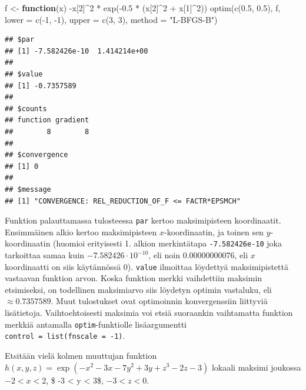 \documentclass[
]{book}
\newenvironment{Shaded}{\begin{snugshade}}{\end{snugshade}}
\newcommand{\AttributeTok}[1]{\textcolor[rgb]{0.77,0.63,0.00}{#1}}
\newcommand{\ControlFlowTok}[1]{\textcolor[rgb]{0.13,0.29,0.53}{\textbf{#1}}}
\newcommand{\DecValTok}[1]{\textcolor[rgb]{0.00,0.00,0.81}{#1}}
\newcommand{\FloatTok}[1]{\textcolor[rgb]{0.00,0.00,0.81}{#1}}
\newcommand{\FunctionTok}[1]{\textcolor[rgb]{0.00,0.00,0.00}{#1}}
\newcommand{\NormalTok}[1]{#1}
\newcommand{\OtherTok}[1]{\textcolor[rgb]{0.56,0.35,0.01}{#1}}
\newcommand{\SpecialCharTok}[1]{\textcolor[rgb]{0.00,0.00,0.00}{#1}}
\newcommand{\StringTok}[1]{\textcolor[rgb]{0.31,0.60,0.02}{#1}}
\begin{document}
\begin{Shaded}
\begin{Highlighting}[]
\NormalTok{f }\OtherTok{\textless{}{-}} \ControlFlowTok{function}\NormalTok{(x) }\SpecialCharTok{{-}}\NormalTok{x[}\DecValTok{2}\NormalTok{]}\SpecialCharTok{\^{}}\DecValTok{2} \SpecialCharTok{*} \FunctionTok{exp}\NormalTok{(}\SpecialCharTok{{-}}\FloatTok{0.5} \SpecialCharTok{*}\NormalTok{ (x[}\DecValTok{2}\NormalTok{]}\SpecialCharTok{\^{}}\DecValTok{2} \SpecialCharTok{+}\NormalTok{ x[}\DecValTok{1}\NormalTok{]}\SpecialCharTok{\^{}}\DecValTok{2}\NormalTok{))}
\FunctionTok{optim}\NormalTok{(}\FunctionTok{c}\NormalTok{(}\FloatTok{0.5}\NormalTok{, }\FloatTok{0.5}\NormalTok{), f, }\AttributeTok{lower =} \FunctionTok{c}\NormalTok{(}\SpecialCharTok{{-}}\DecValTok{1}\NormalTok{, }\SpecialCharTok{{-}}\DecValTok{1}\NormalTok{), }\AttributeTok{upper =} \FunctionTok{c}\NormalTok{(}\DecValTok{3}\NormalTok{, }\DecValTok{3}\NormalTok{), }\AttributeTok{method =} \StringTok{"L{-}BFGS{-}B"}\NormalTok{)}
\end{Highlighting}
\end{Shaded}

\begin{verbatim}
## $par
## [1] -7.582426e-10  1.414214e+00
## 
## $value
## [1] -0.7357589
## 
## $counts
## function gradient 
##        8        8 
## 
## $convergence
## [1] 0
## 
## $message
## [1] "CONVERGENCE: REL_REDUCTION_OF_F <= FACTR*EPSMCH"
\end{verbatim}

Funktion palauttamassa tulosteessa \texttt{par} kertoo maksimipisteen koordinaatit. Ensimmäinen alkio kertoo maksimipisteen \(x\)-koordinaatin, ja toinen sen \(y\)-koordinaatin (huomioi erityisesti 1. alkion merkintätapa \texttt{-7.582426e-10} joka tarkoittaa samaa kuin \(-7.582426 \cdot 10^{-10}\), eli noin \(0.00000000076\), eli \(x\) koordinaatti on siis käytännössä \(0\)). \texttt{value} ilmoittaa löydettyä maksimipistettä vastaavan funktion arvon. Koska funktion merkki vaihdettiin maksimin etsimiseksi, on todellinen maksimiarvo siis löydetyn optimin vastaluku, eli \(\approx 0.7357589\). Muut tulostukset ovat optimoinnin konvergenssiin liittyviä lisätietoja. Vaihtoehtoisesti maksimia voi etsiä suoraankin vaihtamatta funktion merkkiä antamalla \texttt{optim}-funktiolle lisäargumentti \texttt{control\ =\ list(fnscale\ =\ -1)}.

Etsitään vielä kolmen muuttujan funktion \(h(x,y,z) = \exp(-x^2-3x-7y^2+3y+z^3-2z-3)\) lokaali maksimi joukossa \(-2 < x < 2\), \$ -3 \textless{} y \textless{} 3\$, \(-3 < z < 0\).
\end{document}
